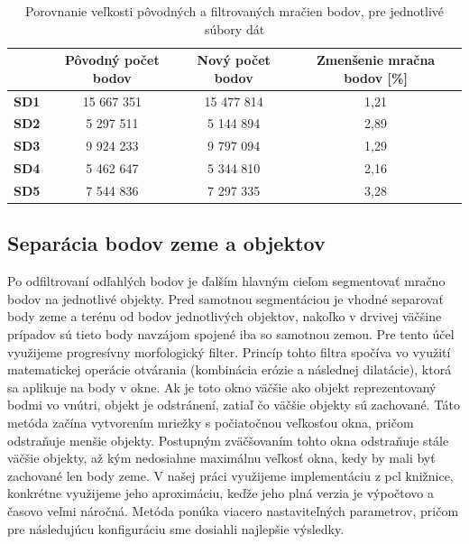 \begin{table}
    \begin{center}
        \begin{tabular}{|c || c | c | c|} 
         \hline
          & \textbf{Pôvodný počet bodov} & \textbf{Nový počet bodov} & \textbf{Zmenšenie mračna bodov [\%]} \\ [0.5ex] 
         \hline\hline
         \textbf{SD1} & 15 667 351 & 15 477 814 & 1,21 \\ 
         \hline
         \textbf{SD2} & 5 297 511 & 5 144 894 & 2,89 \\
         \hline
         \textbf{SD3} &  9 924 233 & 9 797 094 & 1,29 \\
         \hline
         \textbf{SD4} & 5 462 647 & 5 344 810 & 2,16 \\
         \hline
         \textbf{SD5} & 7 544 836 & 7 297 335 & 3,28 \\
         \hline
        \end{tabular}
    \caption{Porovnanie veľkosti pôvodných a filtrovaných mračien bodov, pre jednotlivé súbory dát}
    \end{center}
\end{table}

\subsection{Separácia bodov zeme a objektov}
\noindent Po odfiltrovaní odľahlých bodov je ďalším hlavným cieľom segmentovať mračno bodov na jednotlivé objekty. Pred samotnou segmentáciou je vhodné separovať body zeme a terénu od bodov jednotlivých objektov, nakoľko v drvivej väčšine prípadov sú tieto body navzájom spojené iba so samotnou zemou.
\newline\indent Pre tento účel využijeme progresívny morfologický filter. Princíp tohto filtra spočíva vo využití matematickej operácie otvárania (kombinácia erózie a následnej dilatácie), ktorá sa aplikuje na body v okne. Ak je toto okno väčšie ako objekt reprezentovaný bodmi vo vnútri, objekt je odstránení, zatiaľ čo väčšie objekty sú zachované. Táto metóda začína vytvorením mriežky s počiatočnou veľkosťou okna, pričom odstraňuje menšie objekty. Postupným zväčšovaním tohto okna odstraňuje stále väčšie objekty, až kým nedosiahne maximálnu veľkosť okna, kedy by mali byť zachované len body zeme. \cite{morph_filter}
\newline\indent V našej práci využijeme implementáciu z \acrshort{pcl} knižnice, konkrétne využijeme jeho aproximáciu, keďže jeho plná verzia je výpočtovo a časovo veľmi náročná. Metóda ponúka viacero nastaviteľných parametrov, pričom pre následujúcu konfiguráciu sme dosiahli najlepšie výsledky. 


